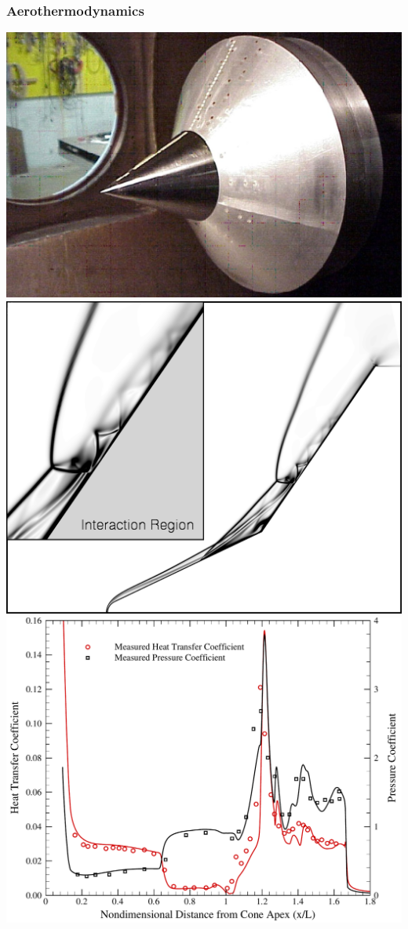 \documentclass[compress,11pt]{beamer}
\begin{document}
\frame
{
  \frametitle{Aerothermodynamics}
  \begin{center}
    \includegraphics[height=.3\textheight]{figures/holden_double_cone/test_article}
    \includegraphics[height=.3\textheight]{figures/holden_double_cone/schlieren}
    \includegraphics[height=.3\textheight]{figures/holden_double_cone/ch_cp_comparison}
  \end{center}
  
}
\end{document}

